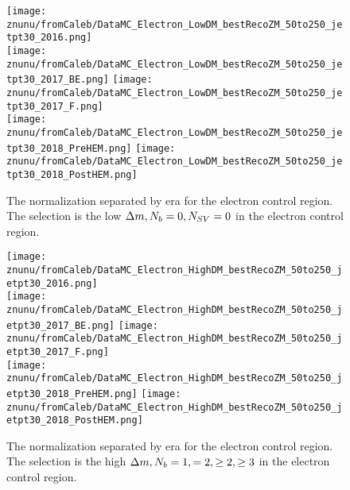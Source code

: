 \begin{figure}[!h]
	\begin{center}
    \texttt{[image: znunu/fromCaleb/DataMC\_Electron\_LowDM\_bestRecoZM\_50to250\_jetpt30\_2016.png]} \\
    \texttt{[image: znunu/fromCaleb/DataMC\_Electron\_LowDM\_bestRecoZM\_50to250\_jetpt30\_2017\_BE.png]} 
    \texttt{[image: znunu/fromCaleb/DataMC\_Electron\_LowDM\_bestRecoZM\_50to250\_jetpt30\_2017\_F.png]} \\
    \texttt{[image: znunu/fromCaleb/DataMC\_Electron\_LowDM\_bestRecoZM\_50to250\_jetpt30\_2018\_PreHEM.png]}
    \texttt{[image: znunu/fromCaleb/DataMC\_Electron\_LowDM\_bestRecoZM\_50to250\_jetpt30\_2018\_PostHEM.png]} \\
	\end{center}
	\caption[\Znunu{} Normalization in low \dm{} for electronss]{The \Znunu{} normalization separated by era for the electron control region. The selection is the low $\Delta m, N_{b}=0, N_{SV}=0$ in the electron control region.
	 }
	\label{fig:znunu-norm-lm-electron}
\end{figure}

\begin{figure}[!h]
	\begin{center}
    \texttt{[image: znunu/fromCaleb/DataMC\_Electron\_HighDM\_bestRecoZM\_50to250\_jetpt30\_2016.png]} \\
    \texttt{[image: znunu/fromCaleb/DataMC\_Electron\_HighDM\_bestRecoZM\_50to250\_jetpt30\_2017\_BE.png]} 
    \texttt{[image: znunu/fromCaleb/DataMC\_Electron\_HighDM\_bestRecoZM\_50to250\_jetpt30\_2017\_F.png]} \\
    \texttt{[image: znunu/fromCaleb/DataMC\_Electron\_HighDM\_bestRecoZM\_50to250\_jetpt30\_2018\_PreHEM.png]}
    \texttt{[image: znunu/fromCaleb/DataMC\_Electron\_HighDM\_bestRecoZM\_50to250\_jetpt30\_2018\_PostHEM.png]} \\
	\end{center}
	\caption[\Znunu{} Normalization in high \dm{} for electrons]{The \Znunu{} normalization separated by era for the electron control region. The selection is the high $\Delta m, N_{b}=1, =2, \geq2,\geq3$ in the electron control region.
	 }
	\label{fig:znunu-norm-hm-electron}
\end{figure}

